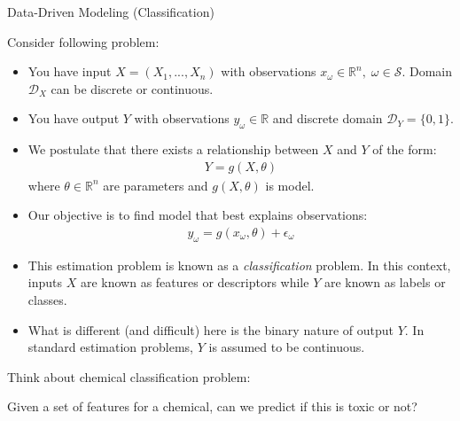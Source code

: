 \documentclass[9pt]{beamer}
\begin{document}

\begin{frame}{Data-Driven Modeling (Classification)}


Consider following problem:
\begin{itemize}
\item You have input $X=(X_1,...,X_n)$ with observations $x_\omega\in \mathbb{R}^n,\; \omega \in \mathcal{S}$. Domain $\mathcal{D}_X$ can be discrete or continuous.
\item You have output $Y$ with observations $y_{\omega}\in \mathbb{R}$ and discrete domain $\mathcal{D}_Y=\{0,1\}$. 
 
\item We postulate that there exists a relationship between $X$ and $Y$ of the form:
\begin{align*}
Y=g(X,\theta)
\end{align*}
where $\theta \in \mathbb{R}^n$ are parameters and $g(X,\theta)$ is model.  

\item Our objective is to find model that best explains observations:
\begin{align*}
y_\omega=g(x_\omega,\theta)+\epsilon_\omega
\end{align*}
\item This estimation problem is known as a {\em classification} problem.  In this context, inputs $X$ are known as features or descriptors while $Y$ are known as labels or classes.  
\item What is different (and difficult) here is the binary nature of output $Y$. In standard estimation problems, $Y$ is assumed to be continuous. 

\end{itemize}

Think about chemical classification problem: 
\begin{block}{}
Given a set of features for a chemical, can we predict if this is toxic or not? 
\end{block}


\end{frame}


\end{document}
